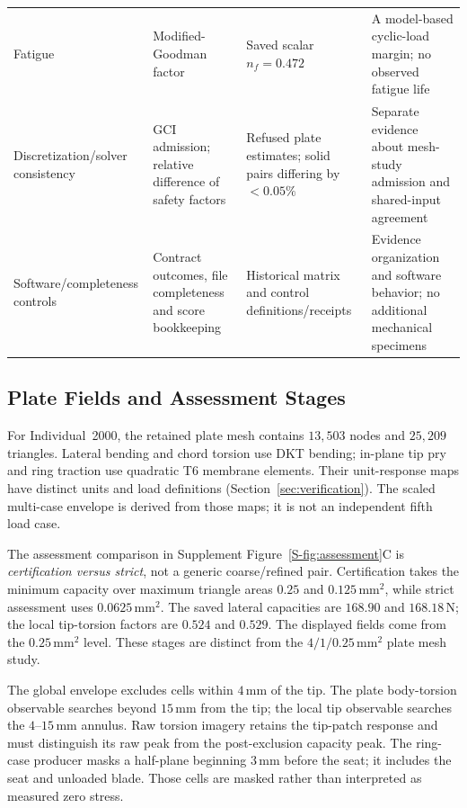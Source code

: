 \begin{table}[t]
\begin{tabular}{@{}>{\raggedright\arraybackslash}p{}>{\raggedright\arraybackslash}p{}>{\raggedright\arraybackslash}p{}>{\raggedright\arraybackslash}p{}@{}}
Fatigue & Modified-Goodman factor & Saved scalar $n_f=0.472$ & A model-based cyclic-load margin; no observed fatigue life \\
Discretization/solver consistency & GCI admission; relative difference of safety factors & Refused plate estimates; solid pairs differing by $<0.05\%$ & Separate evidence about mesh-study admission and shared-input agreement \\
Software/completeness controls & Contract outcomes, file completeness and score bookkeeping & Historical matrix and control definitions/receipts & Evidence organization and software behavior; no additional mechanical specimens \\
\bottomrule
\end{tabular}
\end{table}

\subsection{Plate Fields and Assessment Stages}
\label{subsec:family-lateral}
\label{subsec:family-ring}
\label{subsec:family-torsion}
For Individual~2000, the retained plate mesh contains $13{,}503$ nodes and $25{,}209$ triangles. Lateral bending and chord torsion use DKT bending; in-plane tip pry and ring traction use quadratic T6 membrane elements. Their unit-response maps have distinct units and load definitions (Section~\ref{sec:verification}). The scaled multi-case envelope is derived from those maps; it is not an independent fifth load case.

The assessment comparison in Supplement Figure~\ref{S-fig:assessment}C is \emph{certification versus strict}, not a generic coarse/refined pair. Certification takes the minimum capacity over maximum triangle areas $0.25$ and $0.125\,\mathrm{mm}^2$, while strict assessment uses $0.0625\,\mathrm{mm}^2$. The saved lateral capacities are $168.90$ and $168.18\,\mathrm{N}$; the local tip-torsion factors are $0.524$ and $0.529$. The displayed fields come from the $0.25\,\mathrm{mm}^2$ level. These stages are distinct from the $4/1/0.25\,\mathrm{mm}^2$ plate mesh study.

The global envelope excludes cells within $4\,\mathrm{mm}$ of the tip. The plate body-torsion observable searches beyond $15\,\mathrm{mm}$ from the tip; the local tip observable searches the $4$--$15\,\mathrm{mm}$ annulus. Raw torsion imagery retains the tip-patch response and must distinguish its raw peak from the post-exclusion capacity peak. The ring-case producer masks a half-plane beginning $3\,\mathrm{mm}$ before the seat; it includes the seat and unloaded blade. Those cells are masked rather than interpreted as measured zero stress.

